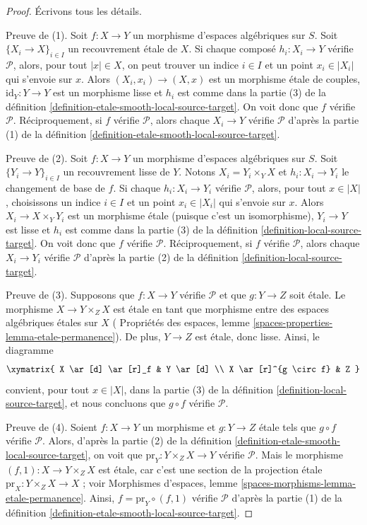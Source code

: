 \begin{proof}
Écrivons tous les détails.

\medskip\noindent
Preuve de (1). Soit $f : X \to Y$ un morphisme d'espaces algébriques sur $S$.
Soit $\{X_i \to X\}_{i \in I}$ un recouvrement \'etale de $X$. Si chaque composé
$h_i : X_i \to Y$ vérifie $\mathcal{P}$, alors, pour tout $|x| \in X$, on peut trouver
un indice $i \in I$ et un point $x_i \in |X_i|$ qui s'envoie sur $x$. Alors
$(X_i, x_i) \to (X, x)$ est un morphisme \'etale de couples,
$\text{id}_Y : Y \to Y$ est un morphisme lisse et $h_i$ est comme dans la partie (3) de la
définition \ref{definition-etale-smooth-local-source-target}.
On voit donc que $f$ vérifie $\mathcal{P}$.
Réciproquement, si $f$ vérifie $\mathcal{P}$, alors chaque $X_i \to Y$ vérifie
$\mathcal{P}$ d'après la
partie (1) de la définition \ref{definition-etale-smooth-local-source-target}.

\medskip\noindent
Preuve de (2). Soit $f : X \to Y$ un morphisme d'espaces algébriques sur $S$.
Soit $\{Y_i \to Y\}_{i \in I}$ un recouvrement lisse de $Y$.
Notons $X_i = Y_i \times_Y X$ et $h_i : X_i \to Y_i$ le changement de base
de $f$. Si chaque $h_i : X_i \to Y_i$ vérifie $\mathcal{P}$, alors, pour tout
$x \in |X|$, choisissons un indice $i \in I$ et un point $x_i \in |X_i|$ qui s'envoie sur $x$.
Alors $X_i \to X \times_Y Y_i$ est un morphisme \'etale
(puisque c'est un isomorphisme), $Y_i \to Y$ est
lisse et $h_i$ est comme dans la partie (3) de la
définition \ref{definition-local-source-target}.
On voit donc que $f$ vérifie $\mathcal{P}$.
Réciproquement, si $f$ vérifie $\mathcal{P}$, alors chaque $X_i \to Y_i$ vérifie
$\mathcal{P}$ d'après la
partie (2) de la définition \ref{definition-local-source-target}.

\medskip\noindent
Preuve de (3). Supposons que $f : X \to Y$ vérifie $\mathcal{P}$ et que $g : Y \to Z$ soit
\'etale. Le morphisme $X \to Y \times_Z X$ est \'etale en tant que morphisme
entre des espaces algébriques \'etales sur $X$ (
Propriétés des espaces, lemme \ref{spaces-properties-lemma-etale-permanence}).
De plus, $Y \to Z$ est \'etale, donc lisse.
Ainsi, le diagramme
$$
\xymatrix{
X \ar[d] \ar[r]_f & Y \ar[d] \\
X \ar[r]^{g \circ f} & Z
}
$$
convient, pour tout $x \in |X|$, dans la partie (3) de la
définition \ref{definition-local-source-target},
et nous concluons que $g \circ f$ vérifie $\mathcal{P}$.

\medskip\noindent
Preuve de (4). Soient $f : X \to Y$ un morphisme et $g : Y \to Z$ \'etale
tels que $g \circ f$ vérifie $\mathcal{P}$. Alors, d'après la
partie (2) de la définition \ref{definition-etale-smooth-local-source-target},
on voit que $\text{pr}_Y : Y \times_Z X \to Y$ vérifie $\mathcal{P}$. Mais
le morphisme $(f, 1) : X \to Y \times_Z X$ est \'etale, car c'est une section de la
projection \'etale $\text{pr}_X : Y \times_Z X \to X$ ; voir
Morphismes d'espaces, lemme \ref{spaces-morphisms-lemma-etale-permanence}.
Ainsi, $f = \text{pr}_Y \circ (f, 1)$ vérifie $\mathcal{P}$ d'après la
partie (1) de la définition \ref{definition-etale-smooth-local-source-target}.
\end{proof}

